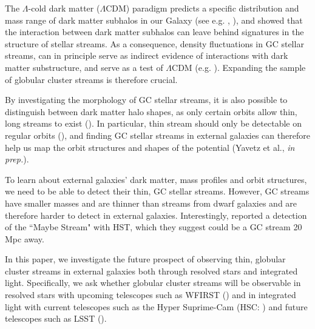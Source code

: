 \documentclass[twocolumn]{aastex62}
\begin{document}
The $\Lambda$-cold dark matter ($\Lambda$CDM) paradigm predicts a specific distribution and mass range of dark matter subhalos in our Galaxy (see e.g. \citealt{bovy17}, \citealt{bonaca19}), and \citet{ibata02} showed that the interaction between dark matter subhalos can leave behind signatures in the structure of stellar streams. As a consequence, density fluctuations in GC stellar streams, can in principle serve as indirect evidence of interactions with dark matter substructure, and serve as a test of $\Lambda$CDM (e.g. \citealt{yoon11}). Expanding the sample of globular cluster streams is therefore crucial. 

By investigating the morphology of GC stellar streams, it is also possible to distinguish between dark matter halo shapes, as only certain orbits allow thin, long streams to exist (\citealt{pearson15}). In particular, thin stream should only be detectable on regular orbits (\citealt{price16}), and finding GC stellar streams in external galaxies can therefore help us map the orbit structures and shapes of the potential (Yavetz et al., {\it in prep.}).

To learn about external galaxies' dark matter, mass profiles and orbit structures, we need to be able to detect their thin, GC stellar streams. However, GC streams have smaller masses and are thinner than streams from dwarf galaxies and are therefore harder to detect in external galaxies. Interestingly, \citet{abraham18} reported a detection of the ``Maybe Stream" with HST, which they suggest could be a GC stream 20 Mpc away. 


In this paper, we investigate the future prospect of observing thin, globular cluster streams in external galaxies both through resolved stars and integrated light. 
Specifically, we ask whether globular cluster streams will be observable in resolved stars with upcoming telescopes such as WFIRST (\citealt{spergel13}) and in integrated light with current telescopes such as the Hyper Suprime-Cam (HSC: \citealt{miyazaki12}) and future telescopes such as LSST (\citealt{ivezi08}). %
\end{document}

